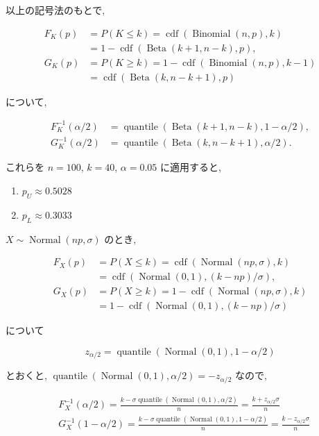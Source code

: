 \documentclass[10pt, a4paper,xelatex,ja=standard]{bxjsarticle}
\newcommand\op{\operatorname}
\begin{document}
以上の記号法のもとで,

\[
\begin{aligned}
F_K(p) &= P(K\le k) = \op{cdf}(\op{Binomial}(n,p), k)
\\ &=
1 - \op{cdf}(\op{Beta}(k+1, n-k), p),
\\
G_K(p) &= P(K\ge k) = 1 - \op{cdf}(\op{Binomial}(n,p), k-1)
\\ &= \op{cdf}(\op{Beta}(k, n-k+1), p)
\end{aligned}
\]

について,

\[
\begin{aligned}
F_K^{-1}(\alpha/2) &= \op{quantile}(\op{Beta}(k+1, n-k), 1 - \alpha/2),
\\
G_K^{-1}(\alpha/2) &= \op{quantile}(\op{Beta}(k, n-k+1), \alpha/2).
\end{aligned}
\]

これらを \(n=100\), \(k=40\), \(\alpha=0.05\) に適用すると,

\begin{enumerate}
\def\labelenumi{(\arabic{enumi})}
\item
  \(p_U \approx 0.5028\)
\item
  \(p_L \approx 0.3033\)
\end{enumerate}

\(X\sim\op{Normal}(np, \sigma)\) のとき,

\[
\begin{aligned}
F_X(p) &= P(X\le k) = \op{cdf}(\op{Normal}(np, \sigma), k)
\\ &=
\op{cdf}(\op{Normal}(0,1), (k-np)/\sigma),
\\
G_X(p) &= P(X\ge k) = 1 - \op{cdf}(\op{Normal}(np, \sigma), k)
\\ &=
1 - \op{cdf}(\op{Normal}(0,1), (k-np)/\sigma)
\end{aligned}
\]

について

\[
z_{\alpha/2} = \op{quantile}(\op{Normal}(0,1), 1 - \alpha/2)
\]

とおくと, \(\op{quantile}(\op{Normal}(0,1), \alpha/2) = -z_{\alpha/2}\)
なので,

\[
\begin{aligned}
&
F_X^{-1}(\alpha/2) =
\frac{k - \sigma\op{quantile}(\op{Normal}(0,1), \alpha/2)}{n} =
\frac{k + z_{\alpha/2}\sigma}{n}
\\ &
G_X^{-1}(1-\alpha/2) =
\frac{k - \sigma\op{quantile}(\op{Normal}(0,1), 1-\alpha/2)}{n} =
\frac{k - z_{\alpha/2}\sigma}{n}
\end{aligned}
\]
\end{document}
